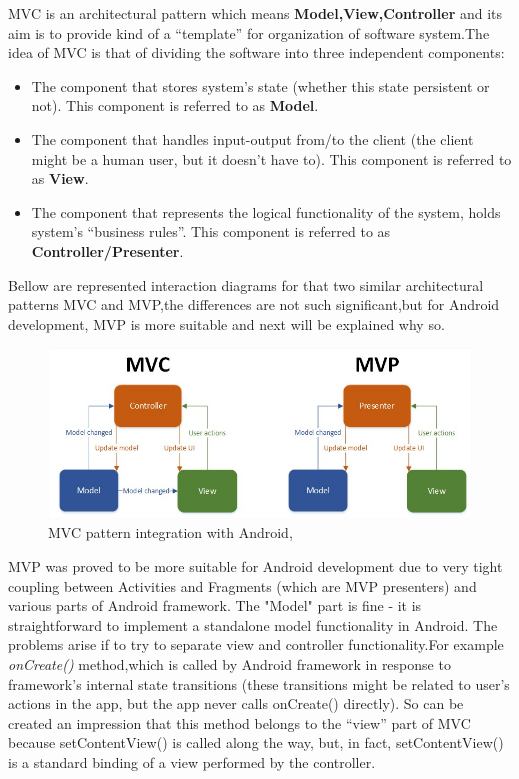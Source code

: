 MVC is an architectural pattern which means \textbf{Model,View,Controller} and its aim is to provide kind of a “template” for organization of software system.The idea of MVC is that of dividing the software into three independent components:
\begin{itemize}
	\item The component that stores system’s state (whether this state persistent or not). This component is referred to as \textbf{Model}.
	\item The component that handles input-output from/to the client (the client might be a human user, but it doesn’t have to). This component is referred to as \textbf{View}.
	\item The component that represents the logical functionality of the system, holds system’s “business rules”. This component is referred to as \textbf{Controller/Presenter}.
\end{itemize}
Bellow are represented interaction diagrams for that two similar architectural patterns MVC and MVP,the differences are not such significant,but for Android development, MVP is more suitable and next will be explained why so.
\begin{figure}[H]
	\centering
	\includegraphics[width=12cm]{Chapter1/mvc-android.jpg}
	\caption{MVC pattern integration with Android, \cite{MVC}}
	\label{fig:MVC-Android}
\end{figure}

MVP was proved to be more suitable for Android development due to very tight coupling between Activities and Fragments (which are MVP presenters) and various parts of Android framework. The "Model" part is fine -  it is straightforward to implement a standalone model functionality in Android. The problems arise if to try to separate view and controller functionality.For example \textit{onCreate()} method,which is called by Android framework in response to framework’s internal state transitions (these transitions might be related to user’s actions in the app,  but the app never calls onCreate() directly). So can be created an impression that this method belongs to the “view” part of MVC because setContentView() is called along the way, but, in fact, setContentView() is a standard binding of a view performed by the controller.

